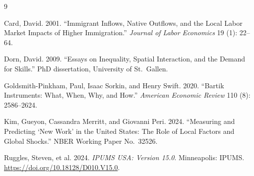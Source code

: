 \documentclass[12pt]{article}
\begin{document}

\begin{thebibliography}{9}

Card, David. 2001. ``Immigrant Inflows, Native Outflows, and the Local
Labor Market Impacts of Higher Immigration.'' \textit{Journal of Labor
Economics} 19 (1): 22--64.

Dorn, David. 2009. ``Essays on Inequality, Spatial Interaction, and the
Demand for Skills.'' PhD dissertation, University of St.\ Gallen.

Goldsmith-Pinkham, Paul, Isaac Sorkin, and Henry Swift. 2020.
``Bartik Instruments: What, When, Why, and How.''
\textit{American Economic Review} 110 (8): 2586--2624.

Kim, Gueyon, Cassandra Merritt, and Giovanni Peri. 2024.
``Measuring and Predicting `New Work' in the United States: The Role
of Local Factors and Global Shocks.'' NBER Working Paper No.\ 32526.

Ruggles, Steven, et al. 2024. \textit{IPUMS USA: Version 15.0}.
Minneapolis: IPUMS. \url{https://doi.org/10.18128/D010.V15.0}.

\end{thebibliography}
\end{document}
